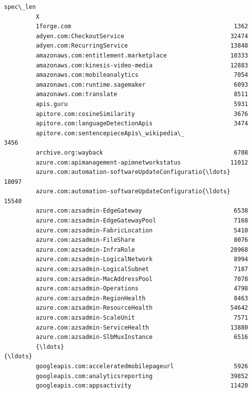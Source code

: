 \documentclass[11pt]{article}
\begin{document}
\begin{Verbatim}[commandchars=\\\{\}]
                                                             spec\_len  
         X                                                             
         1forge.com                                              1362  
         adyen.com:CheckoutService                              32474  
         adyen.com:RecurringService                             13848  
         amazonaws.com:entitlement.marketplace                  10333  
         amazonaws.com:kinesis-video-media                      12883  
         amazonaws.com:mobileanalytics                           7054  
         amazonaws.com:runtime.sagemaker                         6093  
         amazonaws.com:translate                                 8511  
         apis.guru                                               5931  
         apitore.com:cosineSimilarity                            3676  
         apitore.com:languageDetectionApis                       3474  
         apitore.com:sentencepieceApis\_wikipedia\_                3456  
         archive.org:wayback                                     6708  
         azure.com:apimanagement-apimnetworkstatus              11012  
         azure.com:automation-softwareUpdateConfiguratio{\ldots}     18097  
         azure.com:automation-softwareUpdateConfiguratio{\ldots}     15540  
         azure.com:azsadmin-EdgeGateway                          6538  
         azure.com:azsadmin-EdgeGatewayPool                      7168  
         azure.com:azsadmin-FabricLocation                       5410  
         azure.com:azsadmin-FileShare                            8076  
         azure.com:azsadmin-InfraRole                           28968  
         azure.com:azsadmin-LogicalNetwork                       8994  
         azure.com:azsadmin-LogicalSubnet                        7187  
         azure.com:azsadmin-MacAddressPool                       7078  
         azure.com:azsadmin-Operations                           4798  
         azure.com:azsadmin-RegionHealth                         8463  
         azure.com:azsadmin-ResourceHealth                      54642  
         azure.com:azsadmin-ScaleUnit                            7571  
         azure.com:azsadmin-ServiceHealth                       13880  
         azure.com:azsadmin-SlbMuxInstance                       6516  
         {\ldots}                                                      {\ldots}  
         googleapis.com:acceleratedmobilepageurl                 5926  
         googleapis.com:analyticsreporting                      39852  
         googleapis.com:appsactivity                            11420  

\end{Verbatim}
\end{document}
